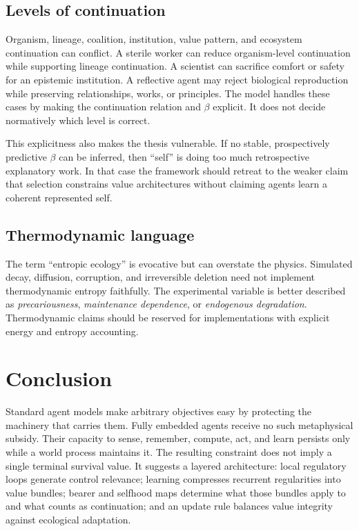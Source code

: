 \documentclass[11pt]{article}
\begin{document}
\subsection{Levels of continuation}

Organism, lineage, coalition, institution, value pattern, and ecosystem continuation can conflict. A sterile worker can reduce organism-level continuation while supporting lineage continuation. A scientist can sacrifice comfort or safety for an epistemic institution. A reflective agent may reject biological reproduction while preserving relationships, works, or principles. The model handles these cases by making the continuation relation and $\beta$ explicit. It does not decide normatively which level is correct.

This explicitness also makes the thesis vulnerable. If no stable, prospectively predictive $\beta$ can be inferred, then ``self'' is doing too much retrospective explanatory work. In that case the framework should retreat to the weaker claim that selection constrains value architectures without claiming agents learn a coherent represented self.

\subsection{Thermodynamic language}

The term ``entropic ecology'' is evocative but can overstate the physics. Simulated decay, diffusion, corruption, and irreversible deletion need not implement thermodynamic entropy faithfully. The experimental variable is better described as \emph{precariousness}, \emph{maintenance dependence}, or \emph{endogenous degradation}. Thermodynamic claims should be reserved for implementations with explicit energy and entropy accounting.

\section{Conclusion}

Standard agent models make arbitrary objectives easy by protecting the machinery that carries them. Fully embedded agents receive no such metaphysical subsidy. Their capacity to sense, remember, compute, act, and learn persists only while a world process maintains it. The resulting constraint does not imply a single terminal survival value. It suggests a layered architecture: local regulatory loops generate control relevance; learning compresses recurrent regularities into value bundles; bearer and selfhood maps determine what those bundles apply to and what counts as continuation; and an update rule balances value integrity against ecological adaptation.
\end{document}
